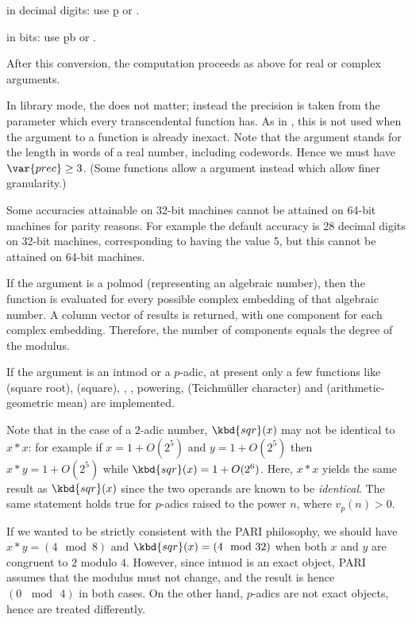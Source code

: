 \item in decimal digits: use \b{p} or .

\item in bits: use \b{pb} or .

After this conversion, the computation proceeds as above for real or complex
arguments.

In library mode, the  does not matter; instead the
precision is taken from the  parameter which every transcendental
function has. As in , this  is not used when the argument
to a function is already inexact. Note that the argument  stands
for the length in words of a real number, including codewords. Hence we must
have $\var{prec} \geq 3$. (Some functions allow a  argument
instead which allow finer granularity.)

Some accuracies attainable on 32-bit machines cannot be attained
on 64-bit machines for parity reasons. For example the default  accuracy
is 28 decimal digits on 32-bit machines, corresponding to  having
the value 5, but this cannot be attained on 64-bit machines.

\item If the argument is a polmod (representing an algebraic number),
then the function is evaluated for every possible complex embedding of that
algebraic number.  A column vector of results is returned, with one component
for each complex embedding.  Therefore, the number of components equals
the degree of the  modulus.

\item If the argument is an intmod or a $p$-adic, at present only a
few functions like  (square root),  (square), ,
, powering,  (Teichm\"uller character) and
 (arithmetic-geometric mean) are implemented.

Note that in the case of a $2$-adic number, $\kbd{sqr}(x)$ may not be
identical to $x*x$: for example if $x = 1+O(2^5)$ and $y = 1+O(2^5)$ then
$x*y = 1+O(2^5)$ while $\kbd{sqr}(x) = 1+O(2^6)$. Here, $x * x$ yields the
same result as $\kbd{sqr}(x)$ since the two operands are known to be
\emph{identical}. The same statement holds true for $p$-adics raised to the
power $n$, where $v_p(n) > 0$.

 If we wanted to be strictly consistent with
the PARI philosophy, we should have $x*y = (4 \mod 8)$ and $\kbd{sqr}(x) =
(4 \mod 32)$ when both $x$ and $y$ are congruent to $2$ modulo $4$.
However, since intmod is an exact object, PARI assumes that the modulus
must not change, and the result is hence $(0\, \mod\, 4)$ in both cases. On
the other hand, $p$-adics are not exact objects, hence are treated
differently.

